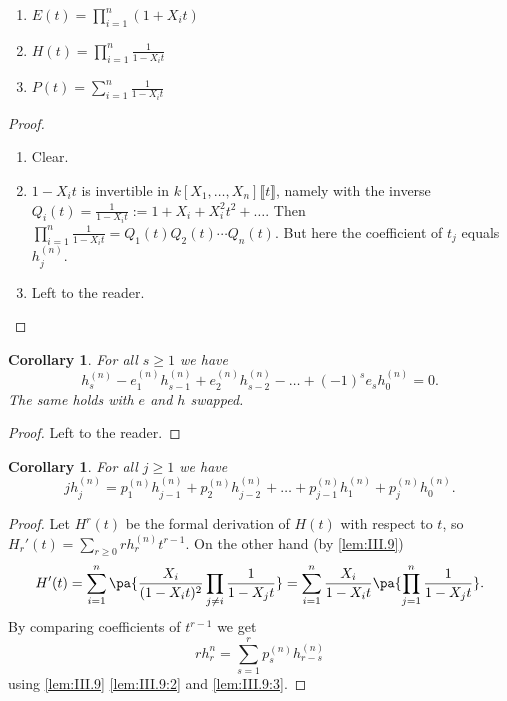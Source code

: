 \documentclass[12pt,a4paper]{scrartcl}
\theoremstyle{cplain}
\newtheorem{cor}[thmcounter]{Corollary}
\theoremstyle{cplain}
\theoremstyle{cplain}
\theoremstyle{definition}
\begin{document}
\begin{otherlanguage}{english}
\begin{lem} \label{lem:III.9}
  \leavevmode
  \begin{enumerate}
    \item\label{lem:III.9:1} $\displaystyle E(t) = \prod_{i=1}^n (1+X_it)$
    \item\label{lem:III.9:2} $\displaystyle H(t) = \prod_{i=1}^n\frac1{1-X_it}$
    \item\label{lem:III.9:3} $\displaystyle P(t) = \sum_{i=1}^n \frac1{1-X_it}$
  \end{enumerate}
\end{lem}
\begin{proof}
  \leavevmode
  \begin{enumerate}[label=\ref{lem:III.9:\arabic*}]
    \item Clear.
    \item $1-X_it$ is invertible in $k[X_1,\ldots,X_n]\llbracket t\rrbracket$, namely with the inverse $Q_i(t) = \frac1{1-X_it} := 1+X_i+X_i^2t^2 + \ldots$. Then $ \prod_{i=1}^n \frac1{1-X_it} = Q_1(t)Q_2(t)\cdots Q_n(t)$. But here the coefficient of $t_j$ equals $h_j^{(n)}$.
    \item Left to the reader. \qedhere
  \end{enumerate}
\end{proof}

\begin{cor} \label{cor:III.10}
  For all $s \ge 1$ we have \[ h_s^{(n)} - e_1^{(n)}h_{s-1}^{(n)} + e_2^{(n)}h_{s-2}^{(n)} - \ldots + (-1)^se_sh_0^{(n)} = 0. \] The same holds with $e$ and $h$ swapped.
\end{cor}
\begin{proof}
  Left to the reader.
\end{proof}

\begin{cor}
  For all $j\ge 1$ we have \[ jh_j^{(n)} = p_1^{(n)}h_{j-1}^{(n)} + p_2^{(n)}h_{j-2}^{(n)} + \ldots + p_{j-1}^{(n)}h_1^{(n)}+p_j^{(n)}h_0^{(n)}. \]
\end{cor}
\begin{proof}
  Let $H^r(t)$ be the formal derivation of $H(t)$ with respect to $t$, so $H_r'(t) = \sum_{r\ge 0}rh_r^{(n)}t^{r-1}$. On the other hand (by \cref{lem:III.9}) \[ H'(t) = \sum_{i=1}^n\pa{\frac{X_i}{(1-X_it)^2}\prod_{j\neq i}\frac1{1-X_jt}} = \sum_{i=1}^n\frac{X_i}{1-X_it}\pa{\prod_{j=1}^n\frac1{1-X_jt}}. \] By comparing coefficients of $t^{r-1}$ we get \[ rh_r^{n} = \sum_{s=1}^rp_s^{(n)}h_{r-s}^{(n)} \] using \cref{lem:III.9} \ref{lem:III.9:2} and \ref{lem:III.9:3}.
\end{proof}


\end{otherlanguage}
\end{document}
